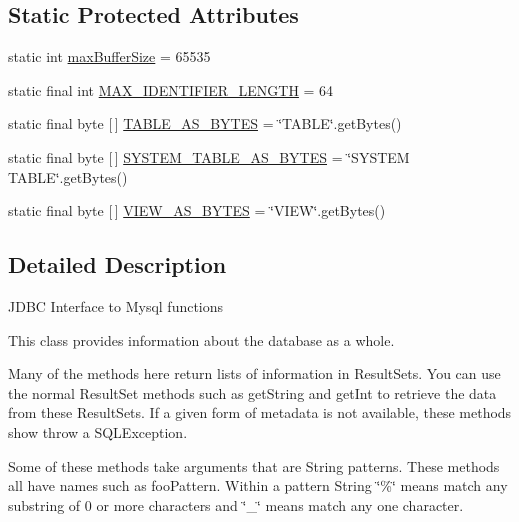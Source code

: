 \subsection*{Static Protected Attributes}
\begin{DoxyCompactItemize}
\item 
static int \mbox{\hyperlink{classcom_1_1mysql_1_1cj_1_1jdbc_1_1_database_meta_data_a1ae01f7ebe1259fcaf0680504abba3a3}{max\+Buffer\+Size}} = 65535
\item 
static final int \mbox{\hyperlink{classcom_1_1mysql_1_1cj_1_1jdbc_1_1_database_meta_data_a44cddec3650fe00c054fb2d953bb1f9e}{M\+A\+X\+\_\+\+I\+D\+E\+N\+T\+I\+F\+I\+E\+R\+\_\+\+L\+E\+N\+G\+TH}} = 64
\item 
static final byte \mbox{[}$\,$\mbox{]} \mbox{\hyperlink{classcom_1_1mysql_1_1cj_1_1jdbc_1_1_database_meta_data_abb219ee6082368e35120e3336386c19a}{T\+A\+B\+L\+E\+\_\+\+A\+S\+\_\+\+B\+Y\+T\+ES}} = \char`\"{}T\+A\+B\+LE\char`\"{}.get\+Bytes()
\item 
static final byte \mbox{[}$\,$\mbox{]} \mbox{\hyperlink{classcom_1_1mysql_1_1cj_1_1jdbc_1_1_database_meta_data_a5f59d4fa1965ab97c6e7370be6b87004}{S\+Y\+S\+T\+E\+M\+\_\+\+T\+A\+B\+L\+E\+\_\+\+A\+S\+\_\+\+B\+Y\+T\+ES}} = \char`\"{}S\+Y\+S\+T\+EM T\+A\+B\+LE\char`\"{}.get\+Bytes()
\item 
static final byte \mbox{[}$\,$\mbox{]} \mbox{\hyperlink{classcom_1_1mysql_1_1cj_1_1jdbc_1_1_database_meta_data_a4d5a906eb142bbaef590b90c6f59dd85}{V\+I\+E\+W\+\_\+\+A\+S\+\_\+\+B\+Y\+T\+ES}} = \char`\"{}V\+I\+EW\char`\"{}.get\+Bytes()
\end{DoxyCompactItemize}


\subsection{Detailed Description}
J\+D\+BC Interface to Mysql functions 

This class provides information about the database as a whole. 

Many of the methods here return lists of information in Result\+Sets. You can use the normal Result\+Set methods such as get\+String and get\+Int to retrieve the data from these Result\+Sets. If a given form of metadata is not available, these methods show throw a S\+Q\+L\+Exception. 

Some of these methods take arguments that are String patterns. These methods all have names such as foo\+Pattern. Within a pattern String \char`\"{}\%\char`\"{} means match any substring of 0 or more characters and \char`\"{}\+\_\+\char`\"{} means match any one character. 

